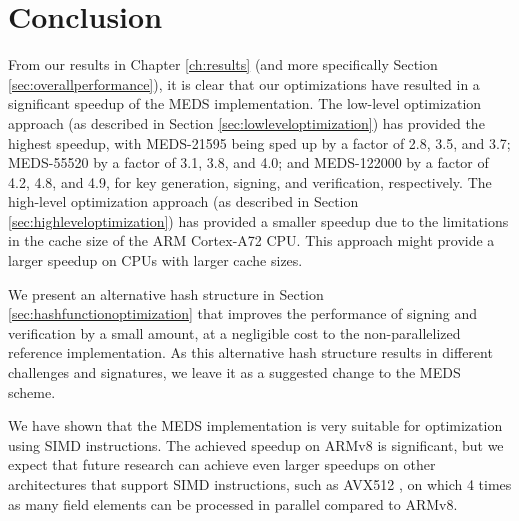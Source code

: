 \documentclass[11pt,a4paper]{report}
\theoremstyle{definition}
\begin{document}
\chapter{Conclusion}
\label{ch:conclusion}
From our results in Chapter \ref{ch:results} (and more specifically Section \ref{sec:overallperformance}), it is clear that our optimizations have resulted in a significant speedup of the MEDS implementation. The low-level optimization approach (as described in Section \ref{sec:lowleveloptimization}) has provided the highest speedup, with MEDS-21595 being sped up by a factor of 2.8, 3.5, and 3.7; MEDS-55520 by a factor of 3.1, 3.8, and 4.0; and MEDS-122000 by a factor of 4.2, 4.8, and 4.9, for key generation, signing, and verification, respectively. The high-level optimization approach (as described in Section \ref{sec:highleveloptimization}) has provided a smaller speedup due to the limitations in the cache size of the ARM Cortex-A72 CPU. This approach might provide a larger speedup on CPUs with larger cache sizes.

We present an alternative hash structure in Section \ref{sec:hashfunctionoptimization} that improves the performance of signing and verification by a small amount, at a negligible cost to the non-parallelized reference implementation. As this alternative hash structure results in different challenges and signatures, we leave it as a suggested change to the MEDS scheme.

We have shown that the MEDS implementation is very suitable for optimization using SIMD instructions. The achieved speedup on ARMv8 is significant, but we expect that future research can achieve even larger speedups on other architectures that support SIMD instructions, such as AVX512 \cite{intel-avx512}, on which 4 times as many field elements can be processed in parallel compared to ARMv8.





\appendix


\end{document}

